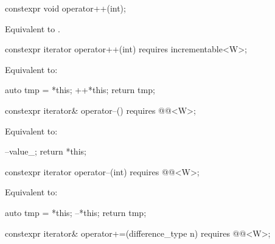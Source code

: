 \begin{itemdecl}
constexpr void operator++(int);
\end{itemdecl}

\begin{itemdescr}
\pnum
\effects Equivalent to .
\end{itemdescr}

\begin{itemdecl}
constexpr iterator operator++(int) requires incrementable<W>;
\end{itemdecl}

\begin{itemdescr}
\pnum
\effects Equivalent to:
\begin{codeblock}
auto tmp = *this;
++*this;
return tmp;
\end{codeblock}
\end{itemdescr}

\begin{itemdecl}
constexpr iterator& operator--() requires @@<W>;
\end{itemdecl}

\begin{itemdescr}
\pnum
\effects Equivalent to:
\begin{codeblock}
--value_;
return *this;
\end{codeblock}
\end{itemdescr}

\begin{itemdecl}
constexpr iterator operator--(int) requires @@<W>;
\end{itemdecl}

\begin{itemdescr}
\pnum
\effects Equivalent to:
\begin{codeblock}
auto tmp = *this;
--*this;
return tmp;
\end{codeblock}
\end{itemdescr}

\begin{itemdecl}
constexpr iterator& operator+=(difference_type n)
  requires @@<W>;
\end{itemdecl}

